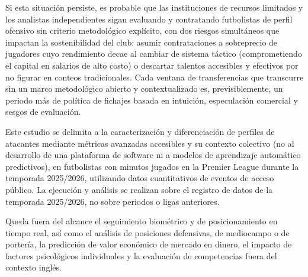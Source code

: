 \vspace{1em}

\hypertarget{sec:consecuencias}{}%
\par
Si esta situación persiste, es probable que las instituciones de recursos limitados y los analistas independientes sigan evaluando y contratando futbolistas de perfil ofensivo sin criterio metodológico explícito, con dos riesgos simultáneos que impactan la sostenibilidad del club: asumir contrataciones a sobreprecio de jugadores cuyo rendimiento decae al cambiar de sistema táctico (comprometiendo el capital en salarios de alto costo) o descartar talentos accesibles y efectivos por no figurar en conteos tradicionales. Cada ventana de transferencias que transcurre sin un marco metodológico abierto y contextualizado es, previsiblemente, un periodo más de política de fichajes basada en intuición, especulación comercial y sesgos de evaluación.

\vspace{1em}

\hypertarget{sec:delimitacion}{}%
\par
Este estudio se delimita a la caracterización y diferenciación de perfiles de atacantes mediante métricas avanzadas accesibles y su contexto colectivo (no al desarrollo de una plataforma de software ni a modelos de aprendizaje automático predictivos), en futbolistas con minutos jugados en la Premier League durante la temporada 2025/2026, utilizando datos cuantitativos de eventos de acceso público. La ejecución y análisis se realizan sobre el registro de datos de la temporada 2025/2026, no sobre periodos o ligas anteriores.

Queda fuera del alcance el seguimiento biométrico y de posicionamiento en tiempo real, así como el análisis de posiciones defensivas, de mediocampo o de portería, la predicción de valor económico de mercado en dinero, el impacto de factores psicológicos individuales y la evaluación de competencias fuera del contexto inglés.